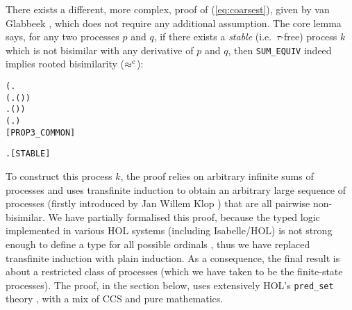 There exists a different, more complex, proof of (\ref{eq:coarsest}),
given by van Glabbeek \cite{van2005characterisation}, which does not
require any additional assumption.
The core lemma says, for
any two processes $p$ and $q$, if there exists a \emph{stable} (i.e.~$\tau$-free)
 process $k$ which is not bisimilar with any derivative of $p$ and
 $q$, then \texttt{SUM_EQUIV} indeed implies rooted bisimilarity ($\mathrel{\approx^{\rm{c}}}$):
\begin{alltt}
\HOLTokenTurnstile{} (\HOLSymConst{\HOLTokenExists{}}.
          \HOLSymConst{\HOLTokenConj{}} (\HOLSymConst{\HOLTokenForall{}} .  \HOLTokenWeakTransBegin{}\HOLTokenImp{}  \HOLSymConst{\HOLTokenImp{}} \HOLSymConst{\HOLTokenNeg{}}( \HOLSymConst{\HOLTokenWeakEQ} )) \HOLSymConst{\HOLTokenConj{}}
        \HOLSymConst{\HOLTokenForall{}} .  \HOLTokenWeakTransBegin{}\HOLTokenImp{}  \HOLSymConst{\HOLTokenImp{}} \HOLSymConst{\HOLTokenNeg{}}( \HOLSymConst{\HOLTokenWeakEQ} )) \HOLSymConst{\HOLTokenImp{}}
   (\HOLSymConst{\HOLTokenForall{}}.  \HOLSymConst{\ensuremath{+}}  \HOLSymConst{\HOLTokenWeakEQ}  \HOLSymConst{\ensuremath{+}} ) \HOLSymConst{\HOLTokenImp{}}
    \HOLSymConst{\HOLTokenObsCongr} \hfill{[PROP3_COMMON]}
\end{alltt}
\begin{alltt}
  \HOLSymConst{\HOLTokenDefEquality{}} \HOLSymConst{\HOLTokenForall{}} .  \HOLTokenTransBegin{}\HOLTokenTransEnd {} \HOLSymConst{\HOLTokenImp{}}  \HOLSymConst{\HOLTokenNotEqual{}} \HOLSymConst{\ensuremath{\tau}}\hfill{[STABLE]}
\end{alltt}
To construct this process $k$,
 the proof relies on arbitrary infinite sums of 
processes and uses transfinite induction to obtain
an arbitrary large sequence of processes (firstly introduced by Jan
Willem Klop \cite{van2005characterisation})
 that are all pairwise non-bisimilar.
We have partially formalised
this proof, because the typed logic
implemented in various HOL systems (including Isabelle/HOL) is not
strong enough to define a type for all possible ordinals
\cite{norrish2013ordinals}, thus
we have replaced transfinite induction with plain induction. As a
consequence, the final
result is about a restricted class of processes (which we have taken
to be the finite-state processes).
The proof, in the section below, uses extensively HOL's
\texttt{pred_set} theory \cite{melham1992hol}, with a mix
of CCS and pure mathematics.



